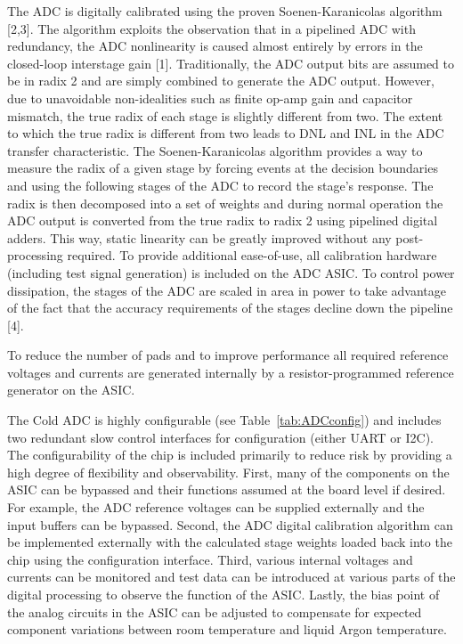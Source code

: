 The ADC is digitally calibrated using the proven Soenen-Karanicolas algorithm [2,3]. The algorithm exploits the observation that in a pipelined ADC with redundancy, the ADC nonlinearity is caused almost entirely by errors in the closed-loop interstage gain [1]. Traditionally, the ADC output bits are assumed to be in radix 2 and are simply combined to generate the ADC output. However, due to unavoidable non-idealities such as finite op-amp gain and capacitor mismatch, the true radix of each stage is slightly different from two. The extent to which the true radix is different from two leads to DNL and INL in the ADC transfer characteristic. The Soenen-Karanicolas algorithm provides a way to measure the radix of a given stage by forcing events at the decision boundaries and using the following stages of the ADC to record the stage’s response. The radix is then decomposed into a set of weights and during normal operation the ADC output is converted from the true radix to radix 2 using pipelined digital adders. This way, static linearity can be greatly improved without any post-processing required. To provide additional ease-of-use, all calibration hardware (including test signal generation) is included on the ADC ASIC. To control power dissipation, the stages of the ADC are scaled in area in power to take advantage of the fact that the accuracy requirements of the stages decline down the pipeline [4].

To reduce the number of pads and to improve performance all required reference voltages and currents are generated internally by a resistor-programmed reference generator on the ASIC.

The Cold ADC is highly configurable (see Table~\ref{tab:ADCconfig}) and includes two redundant slow control interfaces for configuration (either UART or I2C). The configurability of the chip is included primarily to reduce risk by providing a high degree of flexibility and observability. First, many of the components on the ASIC can be bypassed and their functions assumed at the board level if desired. For example, the ADC reference voltages can be supplied externally and the input buffers can be bypassed. Second, the ADC digital calibration algorithm can be implemented externally with the calculated stage weights loaded back into the chip using the configuration interface. Third, various internal voltages and currents can be monitored and test data can be introduced at various parts of the digital processing to observe the function of the ASIC. Lastly, the bias point of the analog circuits in the ASIC can be adjusted to compensate for expected component variations between room temperature and liquid Argon temperature.

